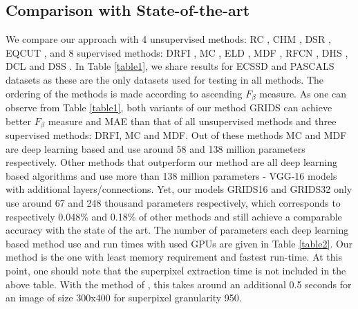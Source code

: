 \documentclass[a4paper,conference]{IEEEtran}
\begin{document}
\subsection{Comparison with State-of-the-art}
We compare our approach with 4 unsupervised methods: RC \cite{Cheng1}, CHM \cite{Li3}, DSR \cite{Li2}, EQCUT \cite{Aytekin2}, and 8 supervised methods: DRFI \cite{Jiang}, MC \cite{Zhao}, ELD \cite{Gayoung}, MDF \cite{Li4}, RFCN \cite{Wang}, DHS \cite{Liu2}, DCL \cite{Li5} and DSS \cite{Hou}.
In Table \ref{table1}, we share results for ECSSD and PASCALS datasets as these are the only datasets used for testing in all methods.
The ordering of the methods is made according to ascending $F_\beta$ measure.
As one can observe from Table \ref{table1}, both variants of our method GRIDS can achieve better $F_\beta$ measure and MAE than that of all unsupervised methods and three supervised methods: DRFI, MC and MDF.
Out of these methods MC and MDF are deep learning based and use around 58 and 138 million parameters respectively.
Other methods that outperform our method are all deep learning based algorithms and use more than 138 million parameters - VGG-16 models with additional layers/connections.
Yet, our models GRIDS16 and GRIDS32 only use around 67 and 248 thousand parameters respectively, which corresponds to respectively 0.048\% and 0.18\% of other methods and still achieve a comparable accuracy with the state of the art.
The number of parameters each deep learning based method use and run times with used GPUs are given in Table \ref{table2}.
Our method is the one with least memory requirement and fastest run-time.
At this point, one should note that the superpixel extraction time is not included in the above table. With the method of \cite{Fu}, this takes around an additional 0.5 seconds for an image of size 300x400 for superpixel granularity 950.
\end{document}
